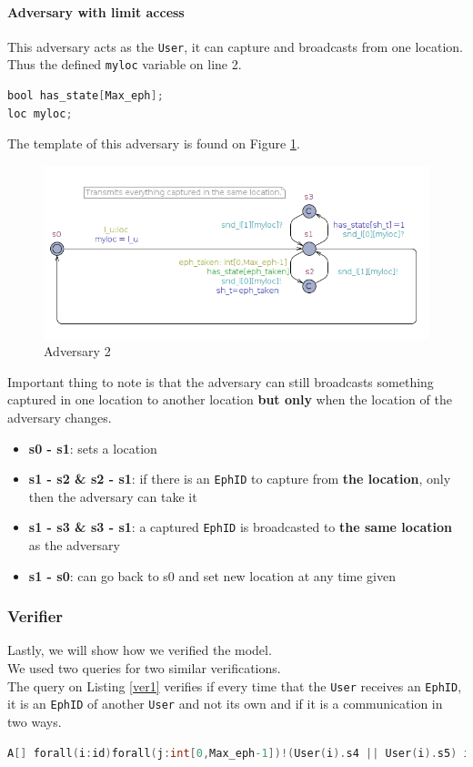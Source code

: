 \documentclass[a4paper, twocolumn]{article}
\begin{document}
\paragraph{Adversary with limit access}
This adversary acts as the \texttt{User}, it can capture and broadcasts from one location. Thus the defined \texttt{myloc} variable on line 2.
\begin{lstlisting}[language=C, caption= Adv2 Declarations,label={ldAdv2},xleftmargin=.02\textwidth]
bool has_state[Max_eph];
loc myloc;
\end{lstlisting}
The template of this adversary is found on Figure \ref{fig:adv2}.
\begin{figure}[H]
    \centering
    \includegraphics[scale=0.33]{images/adv2.png}
    \caption{Adversary 2}
    \label{fig:adv2} 
\end{figure}
\noindent Important thing to note is that the adversary can still broadcasts something captured in one location to another location \textbf{but only} when the location of the adversary changes.
\begin{itemize}
    \item \textbf{s0 - s1}: sets a location
    \item \textbf{s1 - s2 \& s2 - s1}: if there is an \texttt{EphID} to capture from \textbf{the location}, only then the adversary can take it
    \item \textbf{s1 - s3 \& s3 - s1}: a captured \texttt{EphID} is broadcasted to \textbf{the same location} as the adversary
    \item \textbf{s1 - s0}: can go back to s0 and set new location at any time given
\end{itemize}

\subsubsection{Verifier}\label{querry}
Lastly, we will show how we verified the model.\\
We used two queries for two similar verifications.\\
The query on Listing \ref{ver1} verifies if every time that the \texttt{User} receives an \texttt{EphID}, it is an \texttt{EphID} of another \texttt{User} and not its own and if it is a communication in two ways.
\begin{lstlisting}[language=C, caption= Weak Verifier,label={ver1}]
A[] forall(i:id)forall(j:int[0,Max_eph-1])!(User(i).s4 || User(i).s5) imply (User(i).r_token[j] imply exists(k:int[0,numEph-1])User(j/numEph+1).r_token[(i-1)*numEph+k])
\end{lstlisting}
\end{document}
